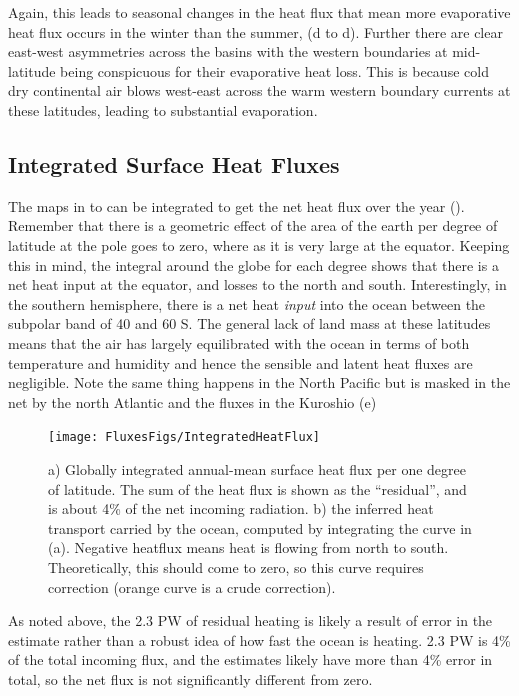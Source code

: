 Again, this leads to seasonal changes in the heat flux that mean more evaporative heat flux occurs in the winter than the summer, (d to d).  Further there are clear east-west asymmetries across the basins with the western boundaries at mid-latitude being conspicuous for their evaporative heat loss.  This is because cold dry continental air blows west-east across the warm western boundary currents at these latitudes, leading to substantial evaporation.  

\subsection{Integrated Surface Heat Fluxes}

The maps in  to  can be integrated to get the net heat flux over the year ().  Remember that there is a geometric effect of the area of the earth per degree of latitude at the pole goes to zero, where as it is very large at the equator.  Keeping this in mind, the integral around the globe for each degree shows that there is a net heat input at the equator, and losses to the north and south.  Interestingly, in the southern hemisphere, there is a net heat \emph{input} into the ocean between the subpolar band of 40 and 60 S.   The general lack of land mass at these latitudes means that the air has largely equilibrated with the ocean in terms of both temperature and humidity and hence the sensible and latent heat fluxes are negligible.  Note the same thing happens in the North Pacific but is masked in the net by the north Atlantic and the fluxes in the Kuroshio (e)

\begin{figure}[htb]
\texttt{[image: FluxesFigs/IntegratedHeatFlux]}
 \caption{a) Globally integrated annual-mean surface heat flux per one degree of latitude.  The sum of the heat flux is shown as the ``residual'', and is about 4\% of the net incoming radiation. b) the inferred heat transport carried by the ocean, computed by integrating the curve in (a).  Negative heatflux means heat is flowing from north to south.  Theoretically, this should come to zero, so this curve requires correction (orange curve is a crude correction).}
  \label{fig:IntegratedHeatFlux}
\end{figure}

As noted above, the 2.3 PW of residual heating is likely a result of error in the estimate rather than a robust idea of how fast the ocean is heating.  2.3 PW is 4\% of the total incoming flux, and the estimates likely have more than 4\% error in total, so the net flux is not significantly different from zero.  

